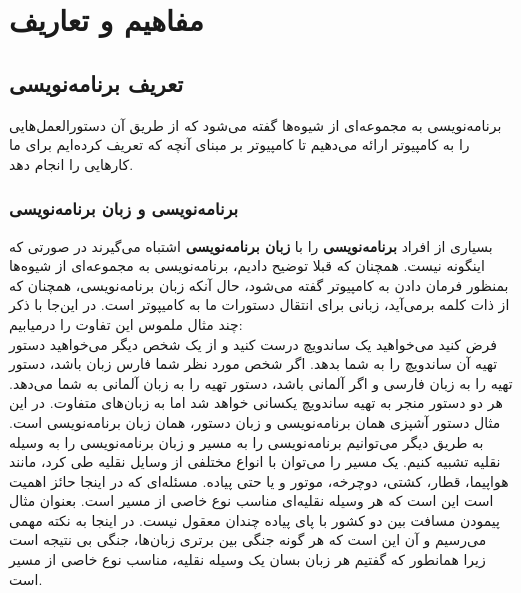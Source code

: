 \chapter{مفاهیم و تعاریف}
\section{تعریف برنامه‌نویسی}
برنامه‌نویسی به مجموعه‌ای از شیوه‌ها گفته می‌شود که از طریق آن دستورالعمل‌هایی را به کامپیوتر ارائه می‌دهیم تا کامپیوتر بر مبنای آنچه که تعریف کرده‌ایم برای ما کارهایی را انجام دهد. 
\subsection{برنامه‌نویسی و زبان برنامه‌نویسی}
بسیاری از افراد \textbf{برنامه‌نویسی } را با \textbf{زبان برنامه‌نویسی} اشتباه می‌گیرند در صورتی که اینگونه نیست. همچنان که قبلا توضیح دادیم، برنامه‌نویسی به مجموعه‌ای از شیوه‌ها بمنظور فرمان دادن به کامپیوتر گفته می‌شود، حال آنکه زبان برنامه‌نویسی، همچنان که از ذات کلمه برمی‌آید، زبانی برای انتقال دستورات ما به کامیپوتر است. در این‌جا با ذکر چند مثال ملموس این تفاوت را درمیابیم:\\
فرض کنید می‌خواهید یک ساندویچ درست کنید و از یک شخص دیگر می‌خواهید دستور تهیه آن ساندویچ را به شما بدهد. اگر شخص مورد نظر شما فارس زبان باشد، دستور تهیه را به زبان فارسی و اگر آلمانی باشد، دستور تهیه را به زبان آلمانی به شما می‌دهد. هر دو دستور منجر به تهیه ساندویچ یکسانی خواهد شد اما به زبان‌های متفاوت. در این مثال دستور آشپزی همان برنامه‌نویسی و زبان دستور، همان زبان برنامه‌نویسی است.
به طریق دیگر می‌توانیم برنامه‌نویسی را به مسیر و  زبان برنامه‌نویسی را به وسیله نقلیه تشبیه کنیم. یک مسیر را می‌توان با انواع مختلفی از وسایل نقلیه طی کرد، مانند هواپیما، قطار، کشتی، دوچرخه، موتور و یا حتی پیاده. مسئله‌ای که در اینجا حائز اهمیت است این است که هر وسیله نقلیه‌ای مناسب نوع خاصی از مسیر است. بعنوان مثال پیمودن مسافت بین دو کشور با پای پیاده چندان معقول نیست. در اینجا به نکته مهمی می‌رسیم و آن این است که هر گونه جنگی بین برتری زبان‌ها، جنگی بی نتیجه است زیرا همانطور که گفتیم هر زبان بسان یک وسیله نقلیه، مناسب نوع خاصی از مسیر است.
